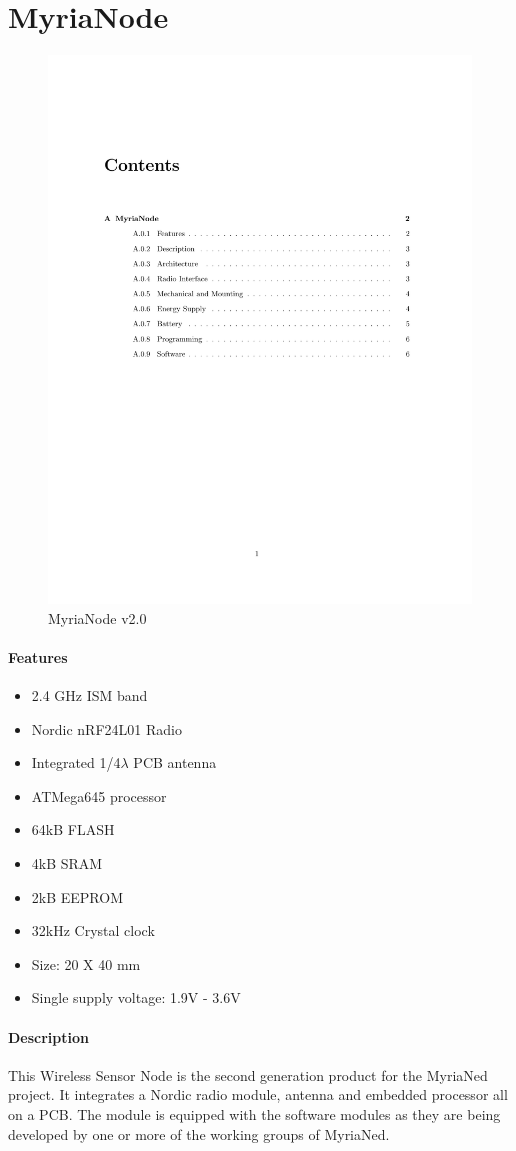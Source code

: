 \documentclass[a4paper,10pt]{report}
\begin{document}
\chapter{MyriaNode}
\begin{figure}[!h]
 \centering
\includegraphics[width=0.5 \textwidth]{myrianode}
\caption{MyriaNode v2.0}
\label{myrianode}
\end{figure}
\subsubsection{Features}
\begin{itemize}
 \item 2.4 GHz ISM band
 \item Nordic nRF24L01 Radio
 \item Integrated 1/4$\lambda$ PCB antenna
 \item ATMega645 processor
 \item 64kB FLASH
 \item 4kB SRAM
 \item 2kB EEPROM
 \item 32kHz Crystal clock
 \item Size: 20 X 40 mm
 \item Single supply voltage: 1.9V - 3.6V
\end{itemize}
\subsubsection{Description}
This Wireless Sensor Node is the second generation product for the MyriaNed project. It integrates a Nordic radio module, antenna and embedded processor
all on a PCB. The module is equipped with the software modules as they are being developed by one or more of the working groups of MyriaNed.
\end{document}
